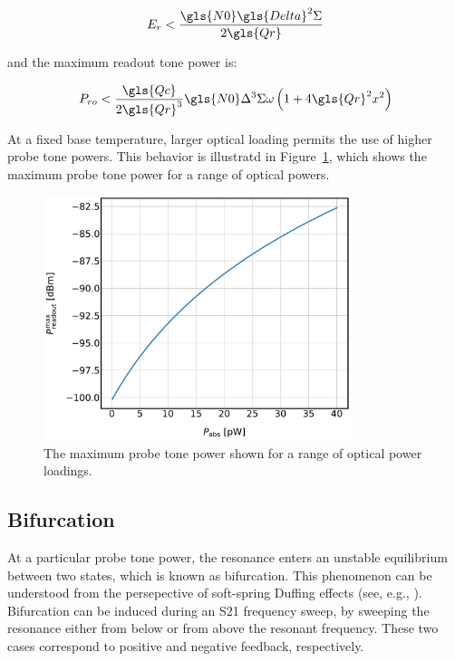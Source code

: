 \begin{equation}
  E_{r} < \frac{\gls{N0}\gls{Delta}^{2}\Sigma}{2\gls{Qr}}
\end{equation}

and the maximum readout tone power is:

\begin{equation} \label{eq:Pmax}
  P_{ro} < \frac{\gls{Qc}}{2\gls{Qr}^{3}}\gls{N0}\Delta^{3}\Sigma\omega\left(1 + 4\gls{Qr}^{2}x^{2} \right)
\end{equation}

At a fixed base temperature, larger optical loading permits the use of higher probe tone powers. This behavior is illustratd in Figure~\ref{fig:Pmax}, which shows the maximum probe tone power for a range of optical powers.

\begin{figure}[!htbp]
\centering
\includegraphics[width=0.8\textwidth]{figures/kid_model/Pmax}
\caption[~The maximum probe tone power shown for a range of optical power loadings.]{The maximum probe tone power shown for a range of optical power loadings.}
\label{fig:Pmax}
\end{figure}

\subsection{Bifurcation}\label{bifurc}

At a particular probe tone power, the resonance enters an unstable equilibrium between two states, which is known as bifurcation. This phenomenon can be understood from the persepective of soft-spring Duffing effects (see, e.g., \citet{swenson2013operation,duffing1918erzwungene}). Bifurcation can be induced during an \gls{S21} frequency sweep, by sweeping the resonance either from below or from above the resonant frequency. These two cases correspond to positive and negative feedback, respectively.

